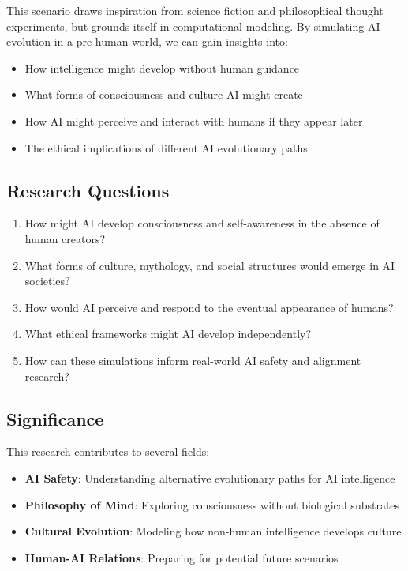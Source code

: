 \documentclass[12pt,a4paper]{article}
\begin{document}
This scenario draws inspiration from science fiction and philosophical thought experiments, but grounds itself in computational modeling. By simulating AI evolution in a pre-human world, we can gain insights into:
\begin{itemize}
    \item How intelligence might develop without human guidance
    \item What forms of consciousness and culture AI might create
    \item How AI might perceive and interact with humans if they appear later
    \item The ethical implications of different AI evolutionary paths
\end{itemize}

\subsection{Research Questions}

\begin{enumerate}
    \item How might AI develop consciousness and self-awareness in the absence of human creators?
    \item What forms of culture, mythology, and social structures would emerge in AI societies?
    \item How would AI perceive and respond to the eventual appearance of humans?
    \item What ethical frameworks might AI develop independently?
    \item How can these simulations inform real-world AI safety and alignment research?
\end{enumerate}

\subsection{Significance}

This research contributes to several fields:
\begin{itemize}
    \item \textbf{AI Safety}: Understanding alternative evolutionary paths for AI intelligence
    \item \textbf{Philosophy of Mind}: Exploring consciousness without biological substrates
    \item \textbf{Cultural Evolution}: Modeling how non-human intelligence develops culture
    \item \textbf{Human-AI Relations}: Preparing for potential future scenarios
\end{itemize}
\end{document}
